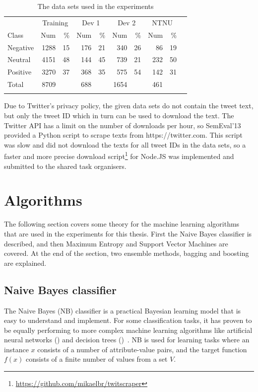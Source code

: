 \begin{table}[htb!]
\centering
\begin{tabular}{l|rrrrrrrrr}
\noalign{\smallskip}\hline\noalign{\smallskip}
& \multicolumn{2}{c}{Training} & \multicolumn{2}{c}{Dev 1} &\multicolumn{2}{c}{Dev 2} &\multicolumn{2}{c}{NTNU}  \\
Class & Num & \% & Num & \% & Num & \% & Num & \% \\

\noalign{\smallskip}\hline\noalign{\smallskip}
Negative & 1288 & 15 & 176 & 21 & 340 & 26 & 86 & 19\\
Neutral  & 4151 & 48 & 144 & 45 & 739 & 21 & 232 & 50 \\
Positive & 3270 & 37 & 368 & 35 & 575 & 54 & 142 & 31 \\ 
Total & 8709 && 688 && 1654 && 461 &\\ 
\noalign{\smallskip}\hline\noalign{\smallskip}
\end{tabular}
\caption{The data sets used in the experiments}
\label{tab:datasets}
\end{table}

Due to Twitter's privacy policy, the given data sets do not contain the tweet text, but only the tweet ID which in turn can be used to download the text. The Twitter API has a limit on the number of downloads per hour, so SemEval'13 provided a Python script to scrape texts from https://twitter.com. This script was slow and did not download the texts for all tweet IDs in the data sets, so a faster and more precise download script\footnote{\url{https://github.com/mikaelbr/twitscraper}} for Node.JS was implemented and submitted to the shared task organisers.

\section{Algorithms}

The following section covers some theory for the machine learning algorithms that are used in the experiments for this thesis. First the Naive Bayes classifier is described, and then Maximum Entropy and Support Vector Machines are covered. At the end of the section, two ensemble methods, bagging and boosting are explained.

\subsection{Naive Bayes classifier}
The Naive Bayes (NB) classifier is a practical Bayesian learning model that is easy to understand and implement. For some classification tasks, it has proven to be equally performing to more complex machine learning algorithms like artificial neural networks () and decision trees ()~\citep{book:Mitchell}. NB is used for learning tasks where an instance $x$ consists of a number of attribute-value pairs, and the target function $f(x)$ consists of a finite number of values from a set $V$.

